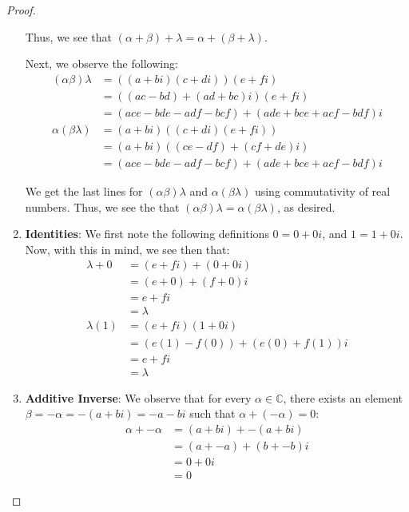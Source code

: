 \documentclass[openany]{book}
\newenvironment{innerproof}{\renewcommand{\qedsymbol}{$\square$}\proof}{\endproof}
\renewcommand\qedsymbol{$\blacksquare$}
\newcommand{\CC}{\mathbb{C}}
\begin{document}
\begin{proof}
\begin{enumerate}
\begin{innerproof}
			Thus, we see that $(\alpha + \beta) + \lambda = \alpha + (\beta + \lambda)$.
			
			Next, we observe the following:
			\begin{align*}
				(\alpha\beta)\lambda &= ( (a+bi)(c+di))(e+fi) \\
				&= ( (ac - bd) + (ad + bc)i)(e + fi) \\
				&= (ace - bde - adf - bcf) + (ade + bce + acf - bdf)i \\
				\alpha(\beta\lambda) &= (a + bi)( (c+di)(e+fi)) \\
				&= (a+bi) ( (ce - df) + (cf + de)i) \\
				&= (ace -bde -adf - bcf) + (ade+bce+acf-bdf)i
			\end{align*}
		
			We get the last lines for $(\alpha\beta)\lambda$ and $\alpha(\beta\lambda)$ using commutativity of real numbers. Thus, we see the that $(\alpha\beta)\lambda = \alpha(\beta\lambda)$, as desired.
		\end{innerproof}
	
		\item \textbf{Identities}:
		\begin{innerproof}
			We first note the following definitions $0 = 0 + 0i$, and $1 = 1 + 0i$. Now, with this in mind, we see then that:
			\begin{align*}
				\lambda + 0 &= (e + fi) + (0 + 0i) \\
				&= (e+0) + (f+0)i \\
				&= e + fi \\
				&= \lambda \\
				\lambda(1) &= (e+fi)(1 + 0i) \\
				&= (e(1) - f(0)) + (e(0) + f(1))i \\
				&= e + fi \\
				&= \lambda
			\end{align*}
		\end{innerproof}
	
	\item \textbf{Additive Inverse}:
	\begin{innerproof}
		We observe that for every $\alpha \in \CC$, there exists an element $\beta = -\alpha = -(a + bi) = -a - bi$ such that $\alpha + (-\alpha) = 0$: 
		\begin{align*}
			\alpha + -\alpha &= (a + bi) + -(a + bi) \\
			&= (a + -a) + (b + -b)i \\
			&= 0 + 0i \\
			&= 0
		\end{align*}
		

\end{innerproof}
\end{enumerate}
\end{proof}
\end{document}
